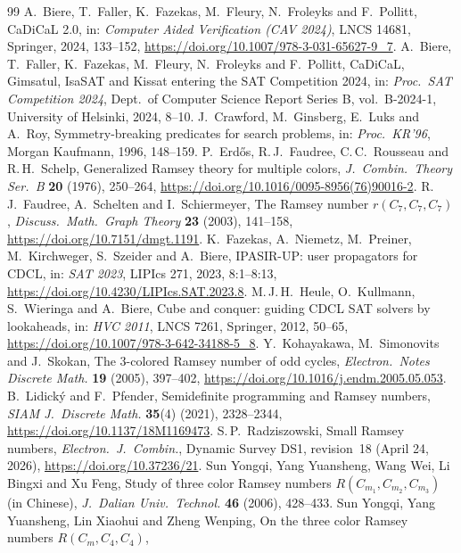 \documentclass[11pt]{amsart}
\theoremstyle{definition}
\theoremstyle{remark}
\begin{document}
\begin{thebibliography}{99}
 A.~Biere, T.~Faller, K.~Fazekas, M.~Fleury, N.~Froleyks and F.~Pollitt, CaDiCaL 2.0, in: \emph{Computer Aided
Verification (CAV 2024)}, LNCS 14681, Springer, 2024, 133--152, \url{https://doi.org/10.1007/978-3-031-65627-9_7}.
 A.~Biere, T.~Faller, K.~Fazekas, M.~Fleury, N.~Froleyks and F.~Pollitt, CaDiCaL, Gimsatul, IsaSAT and Kissat entering
the SAT Competition 2024, in: \emph{Proc.\ SAT Competition 2024}, Dept.\ of Computer Science Report Series B, vol.\ B-2024-1,
University of Helsinki, 2024, 8--10.
 J.~Crawford, M.~Ginsberg, E.~Luks and A.~Roy, Symmetry-breaking predicates for search problems, in: \emph{Proc.\ KR'96},
Morgan Kaufmann, 1996, 148--159.
 P.~Erd\H{o}s, R.\,J.~Faudree, C.\,C.~Rousseau and R.\,H.~Schelp, Generalized Ramsey theory for multiple colors,
\emph{J.\ Combin.\ Theory Ser.\ B} \textbf{20} (1976), 250--264, \url{https://doi.org/10.1016/0095-8956(76)90016-2}.
 R.\,J.~Faudree, A.~Schelten and I.~Schiermeyer, The Ramsey number $r(C_7,C_7,C_7)$, \emph{Discuss.\ Math.\ Graph
Theory} \textbf{23} (2003), 141--158, \url{https://doi.org/10.7151/dmgt.1191}.
 K.~Fazekas, A.~Niemetz, M.~Preiner, M.~Kirchweger, S.~Szeider and A.~Biere, IPASIR-UP: user propagators for CDCL,
in: \emph{SAT 2023}, LIPIcs 271, 2023, 8:1--8:13, \url{https://doi.org/10.4230/LIPIcs.SAT.2023.8}.
 M.\,J.\,H.~Heule, O.~Kullmann, S.~Wieringa and A.~Biere, Cube and conquer: guiding CDCL SAT solvers by lookaheads,
in: \emph{HVC 2011}, LNCS 7261, Springer, 2012, 50--65, \url{https://doi.org/10.1007/978-3-642-34188-5_8}.
 Y.~Kohayakawa, M.~Simonovits and J.~Skokan, The 3-colored Ramsey number of odd cycles, \emph{Electron.\ Notes
Discrete Math.} \textbf{19} (2005), 397--402, \url{https://doi.org/10.1016/j.endm.2005.05.053}.
 B.~Lidick\'y and F.~Pfender, Semidefinite programming and Ramsey numbers, \emph{SIAM J.\ Discrete Math.} \textbf{35}(4)
(2021), 2328--2344, \url{https://doi.org/10.1137/18M1169473}.
 S.\,P.~Radziszowski, Small Ramsey numbers, \emph{Electron.\ J.\ Combin.}, Dynamic Survey DS1, revision~18 (April 24,
2026), \url{https://doi.org/10.37236/21}.
 Sun Yongqi, Yang Yuansheng, Wang Wei, Li Bingxi and Xu Feng, Study of three color Ramsey numbers
$R(C_{m_1},C_{m_2},C_{m_3})$ (in Chinese), \emph{J.\ Dalian Univ.\ Technol.} \textbf{46} (2006), 428--433.
 Sun Yongqi, Yang Yuansheng, Lin Xiaohui and Zheng Wenping, On the three color Ramsey numbers $R(C_m,C_4,C_4)$,

\end{thebibliography}
\end{document}
